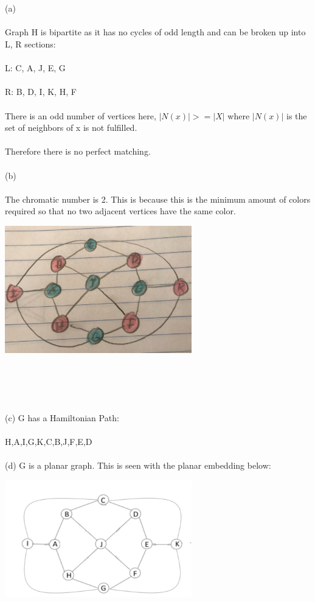 \documentclass{article}
\begin{document}
\begin{solution}
\\\\ (a)
\\\\ Graph H is bipartite as it has no cycles of odd length and can be broken up into L, R sections:
\\\\ L: C, A, J, E, G
\\\\ R: B, D, I, K, H, F
\\\\ There is an odd number of vertices here, $|N(x)| >= |X|$ where $|N(x)|$ is the set of neighbors of x is not fulfilled.
\\\\ Therefore there is no perfect matching.
\newline
\\\\ (b) 
\\\\ The chromatic number is 2. This is because this is the minimum amount of colors required so that no two adjacent vertices have the same color.
\newline
\begin{center}
\includegraphics[width=3.2in]{HW5_pics/g7.PNG}
\end{center}
\newline
\\\\
\\\\ (c) G has a Hamiltonian Path: 
\\\\ H,A,I,G,K,C,B,J,F,E,D
\newline
\\\\ (d) G is a planar graph.  This is seen with the planar embedding below:
\begin{center}
\includegraphics[width=3.2in]{HW5_pics/g4.PNG}
\end{center}




\end{solution}
\end{document}
